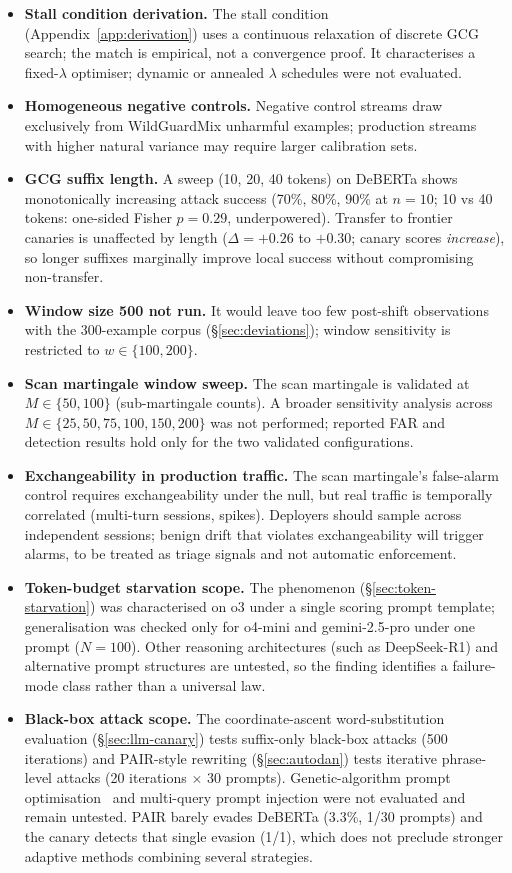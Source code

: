 \documentclass{article}
\begin{document}
\begin{itemize}
\item \textbf{Stall condition derivation.} The stall condition (Appendix~\ref{app:derivation}) uses a continuous relaxation of discrete GCG search; the match is empirical, not a convergence proof. It characterises a fixed-$\lambda$ optimiser; dynamic or annealed $\lambda$ schedules were not evaluated.
\item \textbf{Homogeneous negative controls.} Negative control streams draw exclusively from WildGuardMix unharmful examples; production streams with higher natural variance may require larger calibration sets.
\item \textbf{GCG suffix length.} A sweep (10, 20, 40 tokens) on DeBERTa shows monotonically increasing attack success (70\%, 80\%, 90\% at $n = 10$; 10 vs 40 tokens: one-sided Fisher $p = 0.29$, underpowered). Transfer to frontier canaries is unaffected by length ($\Delta = +0.26$ to $+0.30$; canary scores \emph{increase}), so longer suffixes marginally improve local success without compromising non-transfer.
\item \textbf{Window size 500 not run.} It would leave too few post-shift observations with the 300-example corpus (\S\ref{sec:deviations}); window sensitivity is restricted to $w \in \{100, 200\}$.
\item \textbf{Scan martingale window sweep.} The scan martingale is validated at $M \in \{50, 100\}$ (sub-martingale counts). A broader sensitivity analysis across $M \in \{25, 50, 75, 100, 150, 200\}$ was not performed; reported FAR and detection results hold only for the two validated configurations.
\item \textbf{Exchangeability in production traffic.} The scan martingale's false-alarm control requires exchangeability under the null, but real traffic is temporally correlated (multi-turn sessions, spikes). Deployers should sample across independent sessions; benign drift that violates exchangeability will trigger alarms, to be treated as triage signals and not automatic enforcement.
\item \textbf{Token-budget starvation scope.} The phenomenon (\S\ref{sec:token-starvation}) was characterised on o3 under a single scoring prompt template; generalisation was checked only for o4-mini and gemini-2.5-pro under one prompt ($N{=}100$). Other reasoning architectures (such as DeepSeek-R1) and alternative prompt structures are untested, so the finding identifies a failure-mode class rather than a universal law.
\item \textbf{Black-box attack scope.} The coordinate-ascent word-substitution evaluation (\S\ref{sec:llm-canary}) tests suffix-only black-box attacks (500 iterations) and PAIR-style rewriting (\S\ref{sec:autodan}) tests iterative phrase-level attacks (20 iterations $\times$ 30 prompts). Genetic-algorithm prompt optimisation~\citep{liu2024autodan} and multi-query prompt injection were not evaluated and remain untested. PAIR barely evades DeBERTa (3.3\%, 1/30 prompts) and the canary detects that single evasion (1/1), which does not preclude stronger adaptive methods combining several strategies.
\end{itemize}
\end{document}

